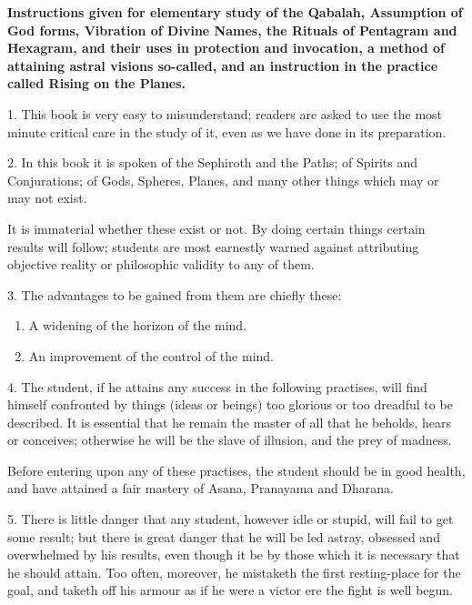 \textbf{Instructions given for elementary study of the Qabalah, Assumption of God forms, Vibration of Divine Names, the Rituals of Pentagram and Hexagram, and their uses in protection and invocation, a method of attaining astral visions so-called, and an instruction in the practice called Rising on the Planes.}


1. This book is very easy to misunderstand; readers are asked to use the most minute critical care in the study of it, even as we have done in its preparation.

2. In this book it is spoken of the Sephiroth and the Paths; of Spirits and Conjurations; of Gods, Spheres, Planes, and many other things which may or may not exist.

It is immaterial whether these exist or not. By doing certain things certain results will follow; students are most earnestly warned against attributing objective reality or philosophic validity to any of them.

3. The advantages to be gained from them are chiefly these:

\begin{enumerate}[label=(\textit{\alph*})]
\item A widening of the horizon of the mind.
\item An improvement of the control of the mind.
\end{enumerate}

4. The student, if he attains any success in the following practises, will find himself confronted by things (ideas or beings) too glorious or too dreadful to be described. It is essential that he remain the master of all that he beholds, hears or conceives; otherwise he will be the slave of illusion, and the prey of madness.

Before entering upon any of these practises, the student should be in good health, and have attained a fair mastery of Asana, Pranayama and Dharana.

5. There is little danger that any student, however idle or stupid, will fail to get some result; but there is great danger that he will be led astray, obsessed and overwhelmed by his results, even though it be by those which it is necessary that he should attain. Too often, moreover, he mistaketh the first resting-place for the goal, and taketh off his armour as if he were a victor ere the fight is well begun.

